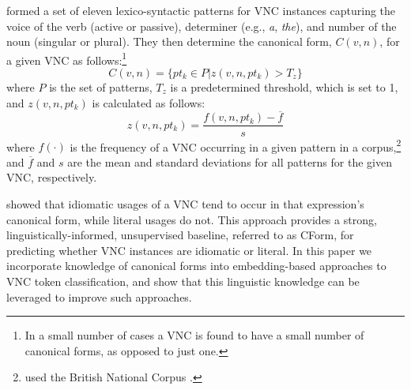 \documentclass[11pt,a4paper]{article}
\begin{document}

 formed a set of eleven lexico-syntactic patterns
for VNC instances capturing the voice of the verb (active or passive),
determiner (e.g., \emph{a}, \emph{the}), and number of the noun
(singular or plural).  They then determine the canonical form,
$C(v,n)$, for a given VNC as follows:\footnote{In a small number of
  cases a VNC is found to have a small number of canonical forms, as
  opposed to just one.}
\begin{equation}
C(v,n) = \{ pt_k \in P | z(v,n,pt_k) > T_z \}
\end{equation}
\noindent
where $P$ is the set of patterns, $T_z$ is a predetermined threshold,
which is set to 1, and $z(v,n,pt_k)$ is calculated as follows:
\begin{equation}
z(v,n,pt_k)= \frac{f(v,n,pt_k)-\overline{f}}{s}
\end{equation}
\noindent
where $f(\cdot)$ is the frequency of a VNC occurring in a given
pattern in a corpus,\footnote{ used the British
  National Corpus \citep{Burnard2000}.} and $\overline{f}$ and $s$ are
the mean and standard deviations for all patterns for the given VNC,
respectively.

 showed that idiomatic usages of a VNC tend to
occur in that expression's canonical form, while literal usages do
not. This approach provides a strong, linguistically-informed,
unsupervised baseline, referred to as CForm, for predicting whether
VNC instances are idiomatic or literal. In this paper we incorporate
knowledge of canonical forms into embedding-based approaches to VNC
token classification, and show that this linguistic knowledge can be
leveraged to improve such approaches.






\end{document}
